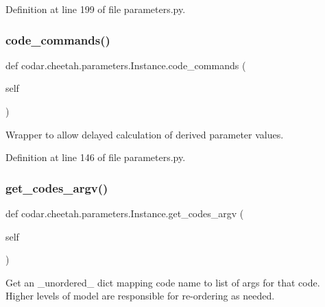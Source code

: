 Definition at line 199 of file parameters.\+py.

\mbox{\label{classcodar_1_1cheetah_1_1parameters_1_1_instance_a417d9d44a5eb0e0b8812fc427ddc4435}} 
\subsubsection{\texorpdfstring{code\+\_\+commands()}{code\_commands()}}
{\footnotesize\ttfamily def codar.\+cheetah.\+parameters.\+Instance.\+code\+\_\+commands (\begin{DoxyParamCaption}\item[{}]{self }\end{DoxyParamCaption})}

\begin{DoxyVerb}Wrapper to allow delayed calculation of derived parameter values.\end{DoxyVerb}
 

Definition at line 146 of file parameters.\+py.

\mbox{\label{classcodar_1_1cheetah_1_1parameters_1_1_instance_a4ee126bbceeb792914185ca9fbe59101}} 
\subsubsection{\texorpdfstring{get\+\_\+codes\+\_\+argv()}{get\_codes\_argv()}}
{\footnotesize\ttfamily def codar.\+cheetah.\+parameters.\+Instance.\+get\+\_\+codes\+\_\+argv (\begin{DoxyParamCaption}\item[{}]{self }\end{DoxyParamCaption})}

\begin{DoxyVerb}Get an _unordered_ dict mapping code name to list of args for
that code. Higher levels of model are responsible for re-ordering
as needed.\end{DoxyVerb}
 

